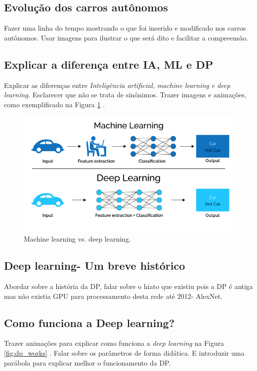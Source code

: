 \documentclass[12pt,a4paper]{article}
\begin{document}
    \subsection{Evolução dos carros autônomos}
    \par Fazer uma linha do tempo mostrando o que foi inserido e modificado nos carros autônomos. Usar imagens para ilustrar o que será dito e facilitar a compreensão.

    \subsection{Explicar a diferença entre IA, ML e DP}
    \par Explicar as diferenças entre \emph{Inteligência artificial, machine learning e deep learning.} Esclarecer que não se trata de sinônimos. Trazer imagens e animações, como exemplificado na Figura \ref{fig:ml_dp} \cite{2}.

    \begin{figure}[H]
        \centering
        \includegraphics[scale=0.5]{ml_dp.png}
        \caption{Machine learning vs. deep learning.}
        \label{fig:ml_dp}
    \end{figure}

    \subsection{Deep learning- Um breve histórico}
    \par Abordar sobre a história da DP, falar sobre o hiato que existiu pois a DP é antiga mas não existia GPU para processamento desta rede até 2012- AlexNet.

    \subsection{Como funciona a Deep learning?}
    \par Trazer animações para explicar como funciona a \emph{deep learning} na Figura \ref{fig:dp_works} \cite{3}. Falar sobre os parâmetros de forma didática. E introduzir uma parábola para explicar melhor o funcionamento da DP.
\end{document}

